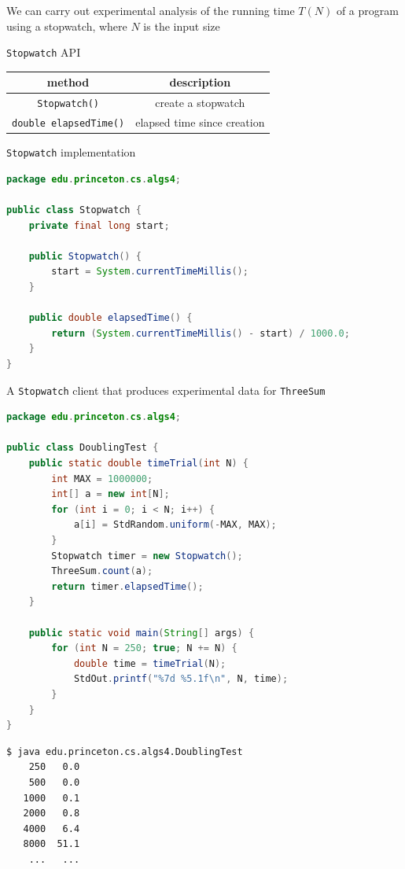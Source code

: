 \documentclass[8pt,a4paper,compress]{beamer}
\begin{document}
\begin{frame}[fragile]
\pause

We can carry out experimental analysis of the running time $T(N)$ of a program using a stopwatch, where $N$ is the input size

\pause
\bigskip

\lstinline{Stopwatch} API
\begin{center}
\begin{tabular}{cc}
method & description \\ \hline
\lstinline$Stopwatch()$ & create a stopwatch \\
\lstinline$double elapsedTime()$ & elapsed time since creation
\end{tabular} 
\end{center}

\pause
\bigskip

\lstinline{Stopwatch} implementation
\begin{lstlisting}[language=Java]
package edu.princeton.cs.algs4;

public class Stopwatch {
    private final long start;
    
    public Stopwatch() { 
        start = System.currentTimeMillis(); 
    }
    
    public double elapsedTime() {
        return (System.currentTimeMillis() - start) / 1000.0;
    }
}
\end{lstlisting}
\end{frame}

\begin{frame}[fragile]
\pause

A \lstinline{Stopwatch} client that produces experimental data for \lstinline{ThreeSum}
\begin{lstlisting}[language=Java]
package edu.princeton.cs.algs4;

public class DoublingTest {
    public static double timeTrial(int N) {
        int MAX = 1000000;
        int[] a = new int[N];
        for (int i = 0; i < N; i++) {
            a[i] = StdRandom.uniform(-MAX, MAX);
        }
        Stopwatch timer = new Stopwatch();
        ThreeSum.count(a);
        return timer.elapsedTime();
    }

    public static void main(String[] args) { 
        for (int N = 250; true; N += N) {
            double time = timeTrial(N);
            StdOut.printf("%7d %5.1f\n", N, time);
        } 
    } 
} 
\end{lstlisting}

\pause

\begin{lstlisting}[language={}]
$ java edu.princeton.cs.algs4.DoublingTest
    250   0.0
    500   0.0
   1000   0.1
   2000   0.8
   4000   6.4
   8000  51.1
    ...   ...
\end{lstlisting}
\end{frame}
\end{document}
